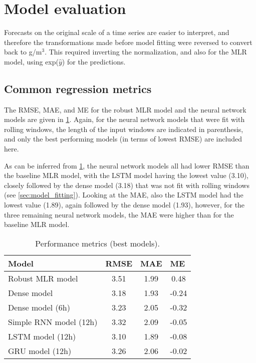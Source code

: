 
\section{Model evaluation}
Forecasts on the original scale of a time series are easier to interpret, and therefore the transformations made before model fitting were reversed to convert back to \textmugreek g/m$^3$. This required inverting the normalization, and also for the MLR model, using exp($\hat{y}$) for the predictions.
\subsection{Common regression metrics}
The RMSE, MAE, and ME for the robust MLR model and the neural network models are given in \cref{tab:performance_metrics}. Again, for the neural network models that were fit with rolling windows, the length of the input windows are indicated in parenthesis, and only the best performing models (in terms of lowest RMSE) are included here. 

As can be inferred from \cref{tab:performance_metrics}, the neural network models all had lower RMSE than the baseline MLR model, with the LSTM model having the lowest value (3.10), closely followed by the dense model (3.18) that was not fit with rolling windows (see \vref{sec:model_fitting}). Looking at the MAE, also the LSTM model had the lowest value (1.89), again followed by the dense model (1.93), however, for the three remaining neural network models, the MAE were higher than for the baseline MLR model. 
\begin{table}[h]
\small
\centering
\caption{Performance metrics (best models). }
\label{tab:performance_metrics}
\begin{tabular}{@{}lccc@{}}
\toprule
Model            & \multicolumn{1}{l}{RMSE} & \multicolumn{1}{l}{MAE} & \multicolumn{1}{l}{ME} \\ \midrule
Robust MLR model & 3.51                     & 1.99                    & 0.48                   \\
Dense model      & 3.18                     & 1.93                    & -0.24                  \\
Dense model (6h) & 3.23                     & 2.05                    & -0.32                  \\
Simple RNN model (12h)  & 3.32                     & 2.09                    & -0.05                  \\
LSTM model (12h) & 3.10                     & 1.89                    & -0.08                  \\
GRU model (12h)  & 3.26                     & 2.06                    & -0.02                  \\ \bottomrule
\end{tabular}
\end{table}

